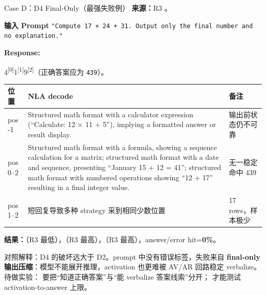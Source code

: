 \begin{frame}{Case D：D4 Final-Only（最强失败例）}
\scriptsize
\textbf{来源：}R3 。

\textbf{输入 Prompt}
\texttt{"Compute 17 × 24 + 31. Output only the final number and no explanation."}

\textbf{Response:}

\colorbox{green!15}{4}\textsuperscript{[{0}]}\colorbox{green!15}{1}\textsuperscript{[{1}]}\colorbox{green!15}{9}\textsuperscript{[{2}]}（正确答案应为 \texttt{439}）。

\begin{tabular}{lp{6.0cm}l}
\toprule
位置 & NLA decode & 备注 \\
\midrule
pos -1 & Structured math format with a calculator expression (``Calculate: 12 × 11 + 5''), implying a formatted answer or result display. & 输出前状态仍不可靠 \\
pos 0--2 & Structured math format with a formula, showing a sequence calculation for a matrix; structured math format with a date and sequence, presenting ``January 15 + 12 = 41''; structured math format with numbered operations showing ``12 + 17'' resulting in a final integer value. & 无一稳定命中 439 \\
pos 1--2 & 短回复导致多种 strategy 采到相同少数位置 & 17 rows，样本极少 \\
\bottomrule
\end{tabular}

\textbf{结果：}（R3 最低），（R3 最高），（R3 最高），answer/error hit=\textbf{0\%}。

\alert{对照解释：}D4 的破坏远大于 D2。prompt 中没有错误标签，失败来自 \textbf{final-only 输出压缩}：模型不能展开推理，activation 也更难被 AV/AR 回路稳定 verbalize。待做实验： 要把“知道正确答案”与“能 verbalize 答案线索”分开； 才能测试 activation-to-answer 上限。
\end{frame}

